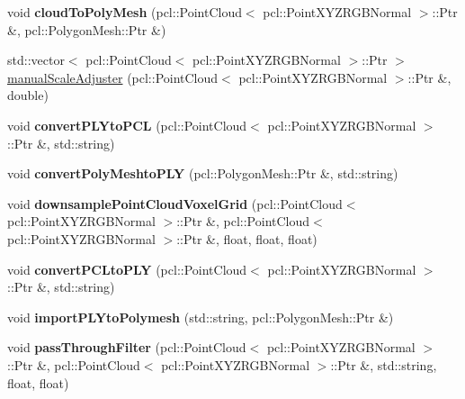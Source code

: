 \begin{DoxyCompactItemize}
\mbox{\label{classReconstruction_a1b7f0942d1540ace69e53c28d3b82023}} 
void {\bfseries cloud\+To\+Poly\+Mesh} (pcl\+::\+Point\+Cloud$<$ pcl\+::\+Point\+X\+Y\+Z\+R\+G\+B\+Normal $>$\+::Ptr \&, pcl\+::\+Polygon\+Mesh\+::\+Ptr \&)
\item 
std\+::vector$<$ pcl\+::\+Point\+Cloud$<$ pcl\+::\+Point\+X\+Y\+Z\+R\+G\+B\+Normal $>$\+::Ptr $>$ \hyperlink{classReconstruction_a6c2151dd4224cee397adb2b353e20e9b}{manual\+Scale\+Adjuster} (pcl\+::\+Point\+Cloud$<$ pcl\+::\+Point\+X\+Y\+Z\+R\+G\+B\+Normal $>$\+::Ptr \&, double)
\item 
\mbox{\label{classReconstruction_a46cab918422a3c74bced403043968992}} 
void {\bfseries convert\+P\+L\+Yto\+P\+CL} (pcl\+::\+Point\+Cloud$<$ pcl\+::\+Point\+X\+Y\+Z\+R\+G\+B\+Normal $>$\+::Ptr \&, std\+::string)
\item 
\mbox{\label{classReconstruction_afab7e493f5aee46722977acd64658c7a}} 
void {\bfseries convert\+Poly\+Meshto\+P\+LY} (pcl\+::\+Polygon\+Mesh\+::\+Ptr \&, std\+::string)
\item 
\mbox{\label{classReconstruction_a82138f7b299c7047f53181b6abb70c81}} 
void {\bfseries downsample\+Point\+Cloud\+Voxel\+Grid} (pcl\+::\+Point\+Cloud$<$ pcl\+::\+Point\+X\+Y\+Z\+R\+G\+B\+Normal $>$\+::Ptr \&, pcl\+::\+Point\+Cloud$<$ pcl\+::\+Point\+X\+Y\+Z\+R\+G\+B\+Normal $>$\+::Ptr \&, float, float, float)
\item 
\mbox{\label{classReconstruction_aad287c118ab81ecf00c29f55314fc237}} 
void {\bfseries convert\+P\+C\+Lto\+P\+LY} (pcl\+::\+Point\+Cloud$<$ pcl\+::\+Point\+X\+Y\+Z\+R\+G\+B\+Normal $>$\+::Ptr \&, std\+::string)
\item 
\mbox{\label{classReconstruction_ac2d96a55242b1849637da44e4e32f725}} 
void {\bfseries import\+P\+L\+Yto\+Polymesh} (std\+::string, pcl\+::\+Polygon\+Mesh\+::\+Ptr \&)
\item 
\mbox{\label{classReconstruction_aa2b56e19c016b8c32ff99e7c5bacb515}} 
void {\bfseries pass\+Through\+Filter} (pcl\+::\+Point\+Cloud$<$ pcl\+::\+Point\+X\+Y\+Z\+R\+G\+B\+Normal $>$\+::Ptr \&, pcl\+::\+Point\+Cloud$<$ pcl\+::\+Point\+X\+Y\+Z\+R\+G\+B\+Normal $>$\+::Ptr \&, std\+::string, float, float)

\end{DoxyCompactItemize}
